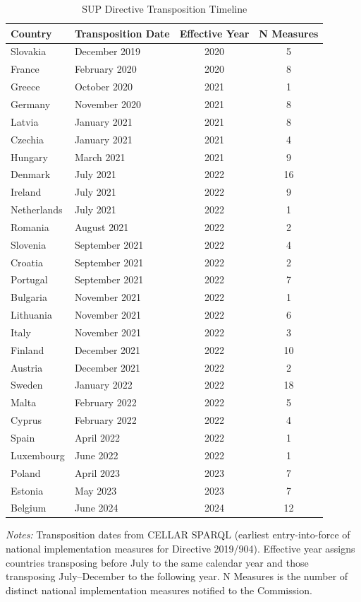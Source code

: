 \begin{table}[t]
\centering
\caption{SUP Directive Transposition Timeline}
\label{tab:transposition}
\begin{tabular}{llcc}
\toprule
  Country & Transposition Date & Effective Year & N Measures \\
\midrule
  Slovakia & December 2019 & 2020 & 5 \\
  France & February 2020 & 2020 & 8 \\
  Greece & October 2020 & 2021 & 1 \\
  Germany & November 2020 & 2021 & 8 \\
  Latvia & January 2021 & 2021 & 8 \\
  Czechia & January 2021 & 2021 & 4 \\
  Hungary & March 2021 & 2021 & 9 \\
  Denmark & July 2021 & 2022 & 16 \\
  Ireland & July 2021 & 2022 & 9 \\
  Netherlands & July 2021 & 2022 & 1 \\
  Romania & August 2021 & 2022 & 2 \\
  Slovenia & September 2021 & 2022 & 4 \\
  Croatia & September 2021 & 2022 & 2 \\
  Portugal & September 2021 & 2022 & 7 \\
  Bulgaria & November 2021 & 2022 & 1 \\
  Lithuania & November 2021 & 2022 & 6 \\
  Italy & November 2021 & 2022 & 3 \\
  Finland & December 2021 & 2022 & 10 \\
  Austria & December 2021 & 2022 & 2 \\
  Sweden & January 2022 & 2022 & 18 \\
  Malta & February 2022 & 2022 & 5 \\
  Cyprus & February 2022 & 2022 & 4 \\
  Spain & April 2022 & 2022 & 1 \\
  Luxembourg & June 2022 & 2022 & 1 \\
  Poland & April 2023 & 2023 & 7 \\
  Estonia & May 2023 & 2023 & 7 \\
  Belgium & June 2024 & 2024 & 12 \\
\bottomrule
\end{tabular}
\begin{tablenotes}[flushleft]
\small
\item \textit{Notes:} Transposition dates from CELLAR SPARQL (earliest entry-into-force of national implementation measures for Directive 2019/904). Effective year assigns countries transposing before July to the same calendar year and those transposing July--December to the following year. N Measures is the number of distinct national implementation measures notified to the Commission.
\end{tablenotes}
\end{table}
